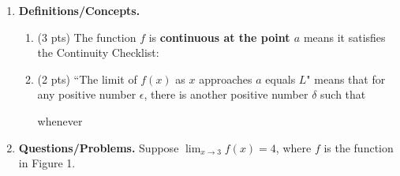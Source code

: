 \documentclass[11pt,letterpaper]{article}
\begin{document}
\begin{enumerate}
\item  \textbf{Definitions/Concepts.} 
\begin{enumerate}
\item (3 pts) The function $f$ is {\bf continuous at the point $a$} means it satisfies the Continuity Checklist:

\vspace{1pc}
\vspace{5.5pc}

\vspace{1pc}
\item (2 pts) ``The limit of $f(x)$ as $x$ approaches $a$ equals $L$" means that for any positive number $\epsilon$, there is another positive number $\delta$ such that

\vspace{0.9pc}
\begin{center}\underline{\hspace{15ex}}\hspace{5ex}whenever\hspace{5ex}\underline{\hspace{15ex}}\end{center}
\end{enumerate}

\vspace{1pc}
\item \textbf{Questions/Problems.} Suppose $\lim_{x\to 3}f(x)=4$, where $f$ is the function in Figure 1.


\end{enumerate}
\end{document}

